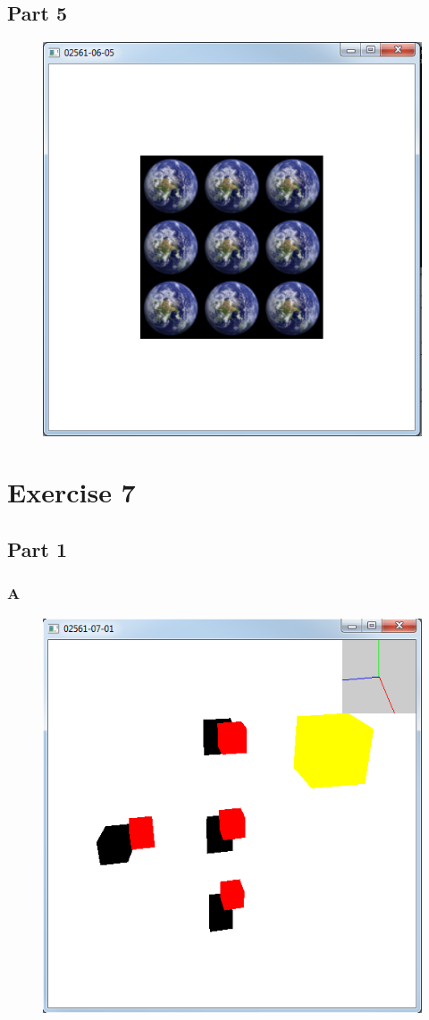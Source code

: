 \documentclass[11pt]{article}
\begin{document}
\subsection{Part 5}
\begin{figure}[H]
	\centering
	\includegraphics[width=0.5\linewidth]{images/e06p5}
	\label{fig:e06p5}
\end{figure}


\section{Exercise 7}
\subsection{Part 1}
\subsubsection{A}
\begin{figure}[H]
	\centering
	\includegraphics[width=0.5\linewidth]{images/e07p1point}
	\label{fig:e07p1point}
\end{figure}
\end{document}
